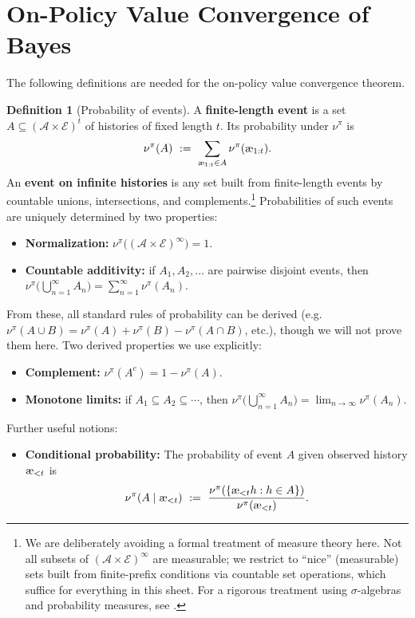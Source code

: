 \documentclass[fontsize=11pt, parskip=half]{scrartcl}
\theoremstyle{definition}
\newtheorem{definition}[theorem]{Definition}
\newcommand{\cA}{\mathcal{A}}
\newcommand{\cE}{\mathcal{E}}
\newcommand{\aes}{\textnormal{\ae}}
\begin{document}
\section{On-Policy Value Convergence of Bayes}\label{prob:on_policy}



The following definitions are needed for the on-policy value convergence theorem.

\begin{definition}[Probability of events]\label{def:events}
A \textbf{finite-length event} is a set $A \subseteq (\cA \times \cE)^t$ of histories of fixed length $t$.
Its probability under $\nu^\pi$ is
\[
    \nu^\pi(A) ~:=~ \sum_{\aes_{1:t} \in A} \nu^\pi(\aes_{1:t}).
\]
An \textbf{event on infinite histories} is any set built from finite-length events by countable unions, intersections, and complements.\footnote{We are deliberately avoiding a formal treatment of measure theory here. Not all subsets of $(\cA \times \cE)^\infty$ are measurable; we restrict to ``nice'' (measurable) sets built from finite-prefix conditions via countable set operations, which suffice for everything in this sheet. For a rigorous treatment using $\sigma$-algebras and probability measures, see \cite[Chapter 2.2]{Hutter:24uaibook2}.}
Probabilities of such events are uniquely determined by two properties:
\begin{itemize}\itemsep=2pt
    \item \textbf{Normalization:} $\nu^\pi\!\big((\cA \times \cE)^\infty\big) = 1$.
    \item \textbf{Countable additivity:} if $A_1, A_2, \ldots$ are pairwise disjoint events, then $\nu^\pi\!\big(\bigcup_{n=1}^\infty A_n\big) = \sum_{n=1}^\infty \nu^\pi(A_n)$.
\end{itemize}
From these, all standard rules of probability can be derived (e.g.\ $\nu^\pi(A \cup B) = \nu^\pi(A) + \nu^\pi(B) - \nu^\pi(A \cap B)$, etc.), though we will not prove them here. Two derived properties we use explicitly:
\begin{itemize}\itemsep=2pt
    \item \textbf{Complement:} $\nu^\pi(A^c) = 1 - \nu^\pi(A)$.
    \item \textbf{Monotone limits:} if $A_1 \subseteq A_2 \subseteq \cdots$, then $\nu^\pi\!\big(\bigcup_{n=1}^\infty A_n\big) = \lim_{n \to \infty} \nu^\pi(A_n)$.
\end{itemize}
Further useful notions:
\begin{itemize}\itemsep=2pt
    \item \textbf{Conditional probability:} The probability of event $A$ given observed history $\aes_{<t}$ is
    \[
        \nu^\pi(A \mid \aes_{<t}) ~:=~ \frac{\nu^\pi(\{\aes_{<t} h : h \in A\})}{\nu^\pi(\aes_{<t})}.
    \]
\end{itemize}
\end{definition}
\end{document}
